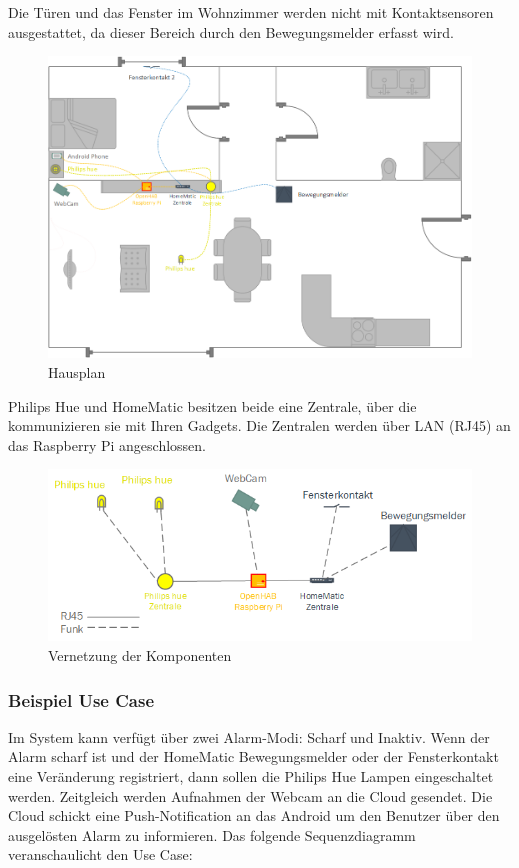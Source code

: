 Die Türen und das Fenster im Wohnzimmer werden nicht mit Kontaktsensoren ausgestattet, da dieser Bereich durch den Bewegungsmelder erfasst wird.

\begin{figure}[H]
	\centering
		\includegraphics[scale=0.55]{report/img/hausplan_aktuell}
	\caption{Hausplan}
	\label{fig:housePlan}
\end{figure}

Philips Hue und HomeMatic besitzen beide eine Zentrale, über die kommunizieren sie mit Ihren Gadgets. Die Zentralen werden über LAN (RJ45) an das Raspberry Pi angeschlossen. \tbd

\begin{figure}[H]
	\centering
		\includegraphics[scale=1]{report/img/vernetzung}
	\caption{Vernetzung der Komponenten}
	\label{fig:componentsIntegration}
\end{figure}

\subsubsection{Beispiel Use Case}
Im System kann verfügt über zwei Alarm-Modi: Scharf und Inaktiv. Wenn der Alarm scharf ist und der HomeMatic Bewegungsmelder oder der Fensterkontakt eine Veränderung registriert, dann sollen die Philips Hue Lampen eingeschaltet werden. Zeitgleich werden Aufnahmen der Webcam an die Cloud gesendet. Die Cloud schickt eine Push-Notification an das Android um den Benutzer über den ausgelösten Alarm zu informieren. Das folgende Sequenzdiagramm veranschaulicht den Use Case:


